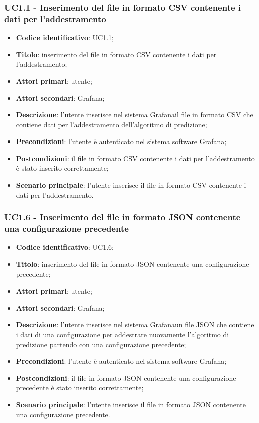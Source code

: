 \subsubsection{UC1.1 - Inserimento del file in formato CSV contenente i dati per l'addestramento}
\begin{itemize}
	\item \textbf{Codice identificativo}: UC1.1;
	\item \textbf{Titolo}: inserimento del file in formato CSV contenente i dati per l'addestramento;
	\item \textbf{Attori primari}: utente;
	\item \textbf{Attori secondari}: Grafana\glo;
	\item \textbf{Descrizione}: l'utente inserisce nel sistema Grafana\glosp il file in formato CSV che contiene dati per l'addestramento dell'algoritmo di predizione;
	\item \textbf{Precondizioni}: l'utente è autenticato nel sistema software Grafana\glo;
	\item \textbf{Postcondizioni}: il file in formato CSV contenente i dati per l'addestramento è stato inserito correttamente;
	\item \textbf{Scenario principale}: l'utente inserisce il file in formato CSV contenente i dati per l'addestramento.
\end{itemize}
\subsubsection{UC1.6 - Inserimento del file in formato JSON contenente una configurazione precedente}
\begin{itemize}
	\item \textbf{Codice identificativo}: UC1.6;
	\item \textbf{Titolo}: inserimento del file in formato JSON contenente una configurazione precedente;
	\item \textbf{Attori primari}: utente;
	\item \textbf{Attori secondari}: Grafana\glo;
	\item \textbf{Descrizione}: l'utente inserisce nel sistema Grafana\glosp un file JSON che contiene i dati di una configurazione per addestrare nuovamente l'algoritmo di predizione partendo con una configurazione precedente;
	\item \textbf{Precondizioni}: l'utente è autenticato nel sistema software Grafana\glo;
	\item \textbf{Postcondizioni}: il file in formato JSON contenente una configurazione precedente è stato inserito correttamente;
	\item \textbf{Scenario principale}: l'utente inserisce il file in formato JSON contenente una configurazione precedente.
\end{itemize}

